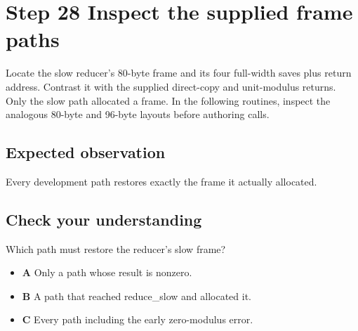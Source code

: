 \section{Step 28 Inspect the supplied frame paths}\label{rsa-s28}

Locate the slow reducer's 80-byte frame and its four full-width saves plus return address. Contrast it with the supplied direct-copy and unit-modulus returns. Only the slow path allocated a frame. In the following routines, inspect the analogous 80-byte and 96-byte layouts before authoring calls.

\subsection{Expected observation}
Every development path restores exactly the frame it actually allocated.

\subsection{Check your understanding}
Which path must restore the reducer's slow frame?

\begin{itemize}
\item \textbf{A} Only a path whose result is nonzero.
\item \textbf{B} A path that reached reduce\_slow and allocated it.
\item \textbf{C} Every path including the early zero-modulus error.
\end{itemize}
